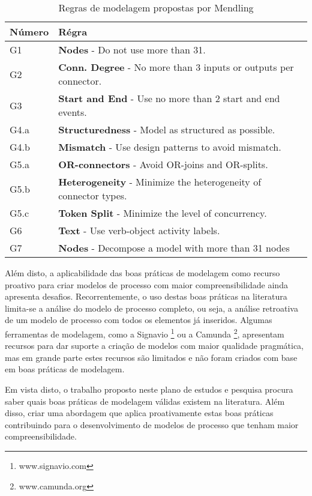 \documentclass[12pt]{article}
\begin{document}
	\begin{table}
		\begin{tabularx}{\textwidth}{l X}\label{7PMG}
			Número & Régra\\\hline
			G1 & \textbf{Nodes} - Do not use more than 31.\\
			G2 & \textbf{Conn. Degree} - No more than 3 inputs or outputs per connector.\\
			G3 & \textbf{Start and End} - Use no more than 2 start and end events.\\
			G4.a & \textbf{Structuredness} - Model as structured as possible.\\
			G4.b & \textbf{Mismatch} - Use design patterns to avoid mismatch.\\
			G5.a & \textbf{OR-connectors} - Avoid OR-joins and OR-splits.\\
			G5.b & \textbf{Heterogeneity} - Minimize the heterogeneity of connector types.\\
			G5.c & \textbf{Token Split} - Minimize the level of concurrency.\\
			G6 & \textbf{Text} - Use verb-object activity labels.\\
			G7 & \textbf{Nodes} - Decompose a model with more than 31 nodes\\
		\end{tabularx}
		\caption{Regras de modelagem propostas por Mendling \cite{Mendling2013}}
	\end{table}


Além disto, a aplicabilidade das boas práticas de modelagem como  recurso proativo para criar modelos de processo com maior compreensibilidade ainda apresenta desafios. Recorrentemente, o uso destas boas práticas na literatura limita-se a análise do modelo de processo completo, ou seja, a análise retroativa de um modelo de processo com todos os elementos já inseridos. Algumas ferramentas de modelagem, como a Signavio \footnote{www.signavio.com} ou a Camunda \footnote{www.camunda.org}, apresentam recursos para dar suporte a criação de modelos com maior qualidade pragmática, mas em grande parte estes recursos são limitados e não foram criados com base em boas práticas de modelagem.

Em vista disto, o trabalho proposto neste plano de estudos e pesquisa procura saber quais boas práticas de modelagem válidas existem na literatura. Além disso, criar uma abordagem que aplica proativamente estas boas práticas contribuindo para o desenvolvimento de modelos de processo que tenham maior compreensibilidade.
\end{document}
